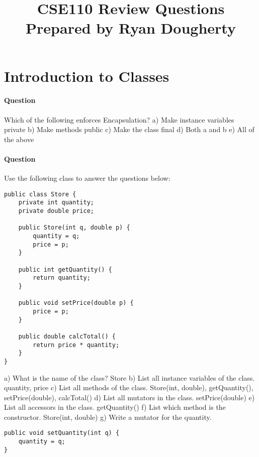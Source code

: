 \documentclass{article}
\date{}
\begin{document}
\title{\textbf{CSE110 Review Questions \\
Prepared by Ryan Dougherty}}
\maketitle

\section*{Introduction to Classes}


\setcounter{question_num}{1}
\paragraph{Question }
Which of the following enforces Encapsulation?
\newline a) Make instance variables private
\newline b) Make methods public
\newline c) Make the class final
\newline d) Both a and b
\newline e) All of the above

\addtocounter{question_num}{1}
\paragraph{Question }
Use the following class to answer the questions below:
\begin{lstlisting}
public class Store {
	private int quantity;
	private double price;

	public Store(int q, double p) {
		quantity = q;
		price = p;
	}

	public int getQuantity() {
		return quantity;
	}

	public void setPrice(double p) {
		price = p;
	}

	public double calcTotal() {
		return price * quantity;
	}
}
\end{lstlisting}
a) What is the name of the class? {\color{red}Store}
\newline b) List all instance variables of the class. {\color{red}quantity, price}
\newline c) List all methods of the class. {\color{red}Store(int, double), getQuantity(), setPrice(double), calcTotal()}
\newline d) List all mutators in the class. {\color{red}setPrice(double)}
\newline e) List all accessors in the class. {\color{red}getQuantity()}
\newline f) List which method is the constructor. {\color{red}Store(int, double)}
\newline g) Write a mutator for the quantity.
\begin{lstlisting}
public void setQuantity(int q) {
	quantity = q;
}
\end{lstlisting}
\end{document}
